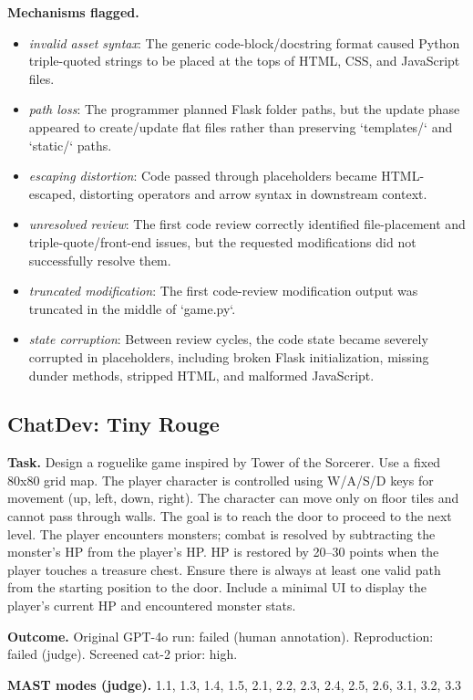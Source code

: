\textbf{Mechanisms flagged.}
\begin{itemize}
  \item \emph{invalid asset syntax}: The generic code-block/docstring format caused Python triple-quoted strings to be placed at the tops of HTML, CSS, and JavaScript files.
  \item \emph{path loss}: The programmer planned Flask folder paths, but the update phase appeared to create/update flat files rather than preserving `templates/` and `static/` paths.
  \item \emph{escaping distortion}: Code passed through placeholders became HTML-escaped, distorting operators and arrow syntax in downstream context.
  \item \emph{unresolved review}: The first code review correctly identified file-placement and triple-quote/front-end issues, but the requested modifications did not successfully resolve them.
  \item \emph{truncated modification}: The first code-review modification output was truncated in the middle of `game.py`.
  \item \emph{state corruption}: Between review cycles, the code state became severely corrupted in placeholders, including broken Flask initialization, missing dunder methods, stripped HTML, and malformed JavaScript.
\end{itemize}

\subsection*{ChatDev: Tiny Rouge}
\textbf{Task.} Design a roguelike game inspired by Tower of the Sorcerer. Use a fixed 80x80 grid map. The player character is controlled using W/A/S/D keys for movement (up, left, down, right). The character can move only on floor tiles and cannot pass through walls. The goal is to reach the door to proceed to the next level. The player encounters monsters; combat is resolved by subtracting the monster's HP from the player's HP. HP is restored by 20--30 points when the player touches a treasure chest. Ensure there is always at least one valid path from the starting position to the door. Include a minimal UI to display the player's current HP and encountered monster stats.

\textbf{Outcome.} Original GPT-4o run: failed (human annotation). Reproduction: failed (judge). Screened cat-2 prior: high.

\textbf{MAST modes (judge).} 1.1, 1.3, 1.4, 1.5, 2.1, 2.2, 2.3, 2.4, 2.5, 2.6, 3.1, 3.2, 3.3

